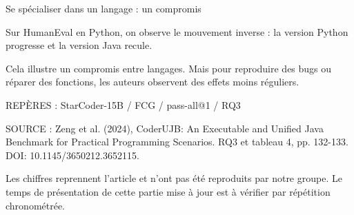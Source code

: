 \documentclass[aspectratio=169]{beamer}
\begin{document}
\begin{frame}{Se spécialiser dans un langage : un compromis}
{Sur HumanEval en Python, on observe le mouvement inverse : la version Python progresse et la version Java recule.

Cela illustre un compromis entre langages. Mais pour reproduire des bugs ou réparer des fonctions, les auteurs observent des effets moins réguliers.

REPÈRES : StarCoder-15B / FCG / pass-all@1 / RQ3

SOURCE : Zeng et al. (2024), CoderUJB: An Executable and Unified Java Benchmark for Practical Programming Scenarios. RQ3 et tableau 4, pp. 132-133. DOI: 10.1145/3650212.3652115.

Les chiffres reprennent l'article et n'ont pas été reproduits par notre groupe. Le temps de présentation de cette partie mise à jour est à vérifier par répétition chronométrée.
}
\end{frame}

\end{document}

